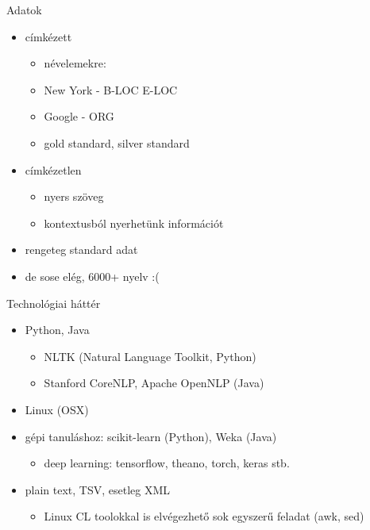 \documentclass[xcolor=rgb]{beamer}
\begin{document}
\begin{frame}{Adatok}
    \pause
    \begin{itemize}
        \item címkézett
            \pause
            \begin{itemize}
                \item névelemekre:
                    \pause
                \item New York - B-LOC E-LOC
                \item Google - ORG
                    \pause
                \item gold standard, silver standard
            \end{itemize}
            \pause
        \item címkézetlen
            \pause
            \begin{itemize}
                \item nyers szöveg
                \item kontextusból nyerhetünk információt
            \end{itemize}
            \pause
        \item rengeteg standard adat
            \pause
        \item de sose elég, 6000+ nyelv :(
    \end{itemize}
\end{frame}

\begin{frame}{Technológiai háttér}
    \begin{itemize}
            \pause
        \item Python, Java
            \pause
            \begin{itemize}
                \item NLTK (Natural Language Toolkit, Python)
                \item Stanford CoreNLP, Apache OpenNLP (Java)
            \end{itemize}
            \pause
        \item Linux (OSX)
            \pause
        \item gépi tanuláshoz: scikit-learn (Python), Weka (Java)
            \begin{itemize}
            \pause
                \item deep learning: tensorflow, theano, torch, keras stb.
            \end{itemize}
            \pause
         \item plain text, TSV, esetleg XML
             \pause
             \begin{itemize}
                 \item Linux CL toolokkal is elvégezhető sok egyszerű feladat (awk, sed)
             \end{itemize}
    \end{itemize}
\end{frame}
\end{document}
